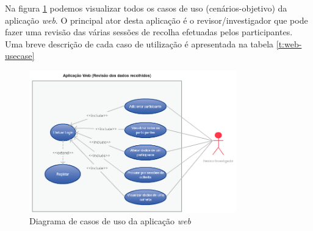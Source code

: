 Na figura \ref{f:usecasewebapp} podemos visualizar todos os casos de uso (cenários-objetivo) da aplicação \textit{web}. O principal ator desta aplicação é o revisor/investigador que pode fazer uma revisão das várias sessões de recolha efetuadas pelos participantes. Uma breve descrição de cada caso de utilização é apresentada na tabela \ref{t:web-usecase}

\begin{figure}[H]
  \centering
  \includegraphics[width=0.8\textwidth]{imgs/app-web-usecase.png}
  \caption[Diagrama de casos de uso da aplicação \textit{web}]{Diagrama de casos de uso da aplicação \textit{web}}
  
  \label{f:usecasewebapp}
\end{figure}




